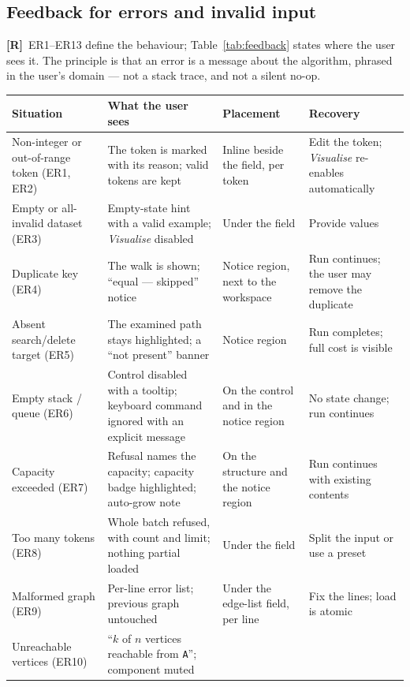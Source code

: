 \documentclass[11pt,a4paper]{article}
\newcommand{\R}{\textcolor{reqc}{\textbf{[R]}}}     %
\newcommand{\ct}[1]{\texttt{#1}}
\begin{document}
\subsection{Feedback for errors and invalid input}

\R\ ER1--ER13 define the behaviour; Table~\ref{tab:feedback} states where the user sees it. The
principle is that an error is a message about the algorithm, phrased in the user's domain ---
not a stack trace, and not a silent no-op.

\begin{table}[H]
\centering
\small
\setlength{\tabcolsep}{4pt}
\begin{tabular}{@{}L{2.4cm}L{4.0cm}L{3.4cm}L{3.5cm}@{}}
\toprule
\textbf{Situation} & \textbf{What the user sees} & \textbf{Placement} & \textbf{Recovery} \\
\midrule
Non-integer or out-of-range token (ER1, ER2) & The token is marked with its reason; valid
tokens are kept & Inline beside the field, per token & Edit the token; \emph{Visualise}
re-enables automatically \\
Empty or all-invalid dataset (ER3) & Empty-state hint with a valid example; \emph{Visualise}
disabled & Under the field & Provide values \\
Duplicate key (ER4) & The walk is shown; ``equal --- skipped'' notice & Notice region, next to
the workspace & Run continues; the user may remove the duplicate \\
Absent search/delete target (ER5) & The examined path stays highlighted; a ``not present''
banner & Notice region & Run completes; full cost is visible \\
Empty stack / queue (ER6) & Control disabled with a tooltip; keyboard command ignored with an
explicit message & On the control and in the notice region & No state change; run continues \\
Capacity exceeded (ER7) & Refusal names the capacity; capacity badge highlighted; auto-grow
note & On the structure and the notice region & Run continues with existing contents \\
Too many tokens (ER8) & Whole batch refused, with count and limit; nothing partial loaded &
Under the field & Split the input or use a preset \\
Malformed graph (ER9) & Per-line error list; previous graph untouched & Under the edge-list
field, per line & Fix the lines; load is atomic \\
Unreachable vertices (ER10) & ``$k$ of $n$ vertices reachable from \ct{A}''; component muted &

\end{tabular}
\end{table}
\end{document}
